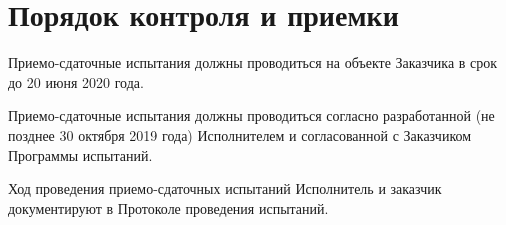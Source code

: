 \section{Порядок контроля и приемки}

Приемо-сдаточные испытания должны проводиться на объекте Заказчика в срок до 20 июня 2020 года.

Приемо-сдаточные испытания должны проводиться согласно разработанной (не позднее 30 октября 2019 года) Исполнителем и согласованной с Заказчиком Программы испытаний.

Ход проведения приемо-сдаточных испытаний Исполнитель и заказчик документируют в Протоколе проведения испытаний.